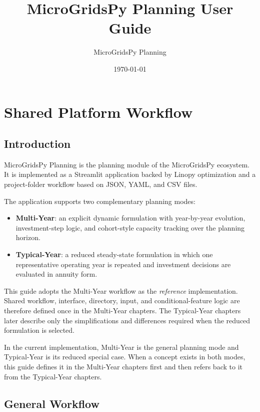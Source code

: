 \documentclass[11pt,a4paper]{report}
\title{MicroGridsPy Planning User Guide}
\author{MicroGridsPy Planning}
\date{\today}
\begin{document}
\maketitle
\tableofcontents

\part{Shared Platform Workflow}

\chapter{Introduction}\label{sec:introduction}

MicroGridsPy Planning is the planning module of the MicroGridsPy ecosystem. It is implemented as a Streamlit application backed by Linopy optimization and a project-folder workflow based on JSON, YAML, and CSV files.

The application supports two complementary planning modes:

\begin{itemize}[leftmargin=1.5em]
  \item \textbf{Multi-Year}: an explicit dynamic formulation with year-by-year evolution, investment-step logic, and cohort-style capacity tracking over the planning horizon.
  \item \textbf{Typical-Year}: a reduced steady-state formulation in which one representative operating year is repeated and investment decisions are evaluated in annuity form.
\end{itemize}

This guide adopts the Multi-Year workflow as the \emph{reference} implementation. Shared workflow, interface, directory, input, and conditional-feature logic are therefore defined once in the Multi-Year chapters. The Typical-Year chapters later describe only the simplifications and differences required when the reduced formulation is selected.

\begin{guidenote}
In the current implementation, Multi-Year is the general planning mode and Typical-Year is its reduced special case. When a concept exists in both modes, this guide defines it in the Multi-Year chapters first and then refers back to it from the Typical-Year chapters.
\end{guidenote}

\chapter{General Workflow}\label{sec:general-workflow}
\end{document}
